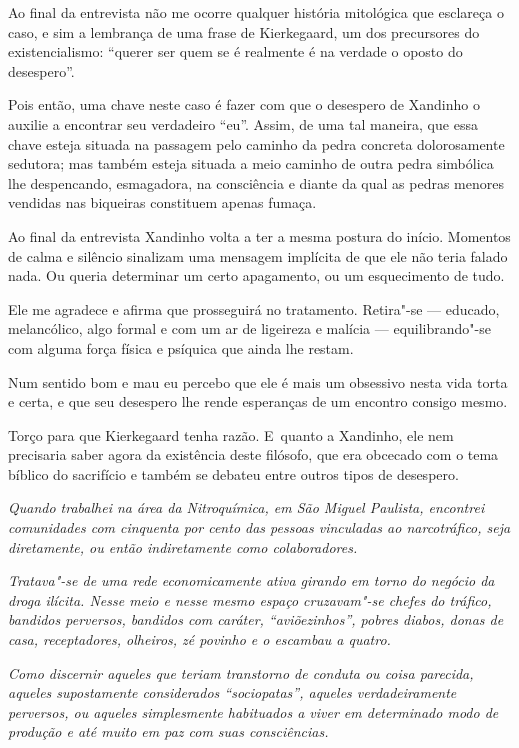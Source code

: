 \asterisc{}

Ao final da entrevista não me ocorre qualquer história mitológica que
esclareça o caso, e sim a lembrança de uma frase de Kierkegaard, um dos
precursores do existencialismo: ``querer ser quem se é realmente é na
verdade o oposto do desespero''.

Pois então, uma chave neste caso é fazer com que o desespero de Xandinho
o auxilie a encontrar seu verdadeiro ``eu''. Assim, de uma tal maneira,
que essa chave esteja situada na passagem pelo caminho da pedra concreta
dolorosamente sedutora; mas também esteja situada a meio caminho de
outra pedra simbólica lhe despencando, esmagadora, na consciência e
diante da qual as pedras menores vendidas nas biqueiras constituem
apenas fumaça.

Ao final da entrevista Xandinho volta a ter a mesma postura do início.
Momentos de calma e silêncio sinalizam uma mensagem implícita de que ele
não teria falado nada. Ou queria determinar um certo apagamento, ou um
esquecimento de tudo.

Ele me agradece e afirma que prosseguirá no tratamento. Retira"-se ---
educado, melancólico, algo formal e com um ar de ligeireza e malícia ---
equilibrando"-se com alguma força física e psíquica que ainda lhe restam.

Num sentido bom e mau eu percebo que ele é mais um obsessivo nesta vida
torta e certa, e que seu desespero lhe rende esperanças de um encontro
consigo mesmo.

Torço para que Kierkegaard tenha razão. E~quanto a Xandinho, ele nem
precisaria saber agora da existência deste filósofo, que era obcecado
com o tema bíblico do sacrifício e também se debateu entre outros tipos
de desespero.~

\asterisc{}
\begingroup\small

\emph{Quando trabalhei na área da Nitroquímica, em
São Miguel Paulista, encontrei comunidades com cinquenta por cento das
pessoas vinculadas ao narcotráfico, seja diretamente, ou então
indiretamente como colaboradores.}

\emph{Tratava"-se de uma rede economicamente ativa girando em torno do
negócio da droga ilícita. Nesse meio e nesse mesmo espaço cruzavam"-se
chefes do tráfico, bandidos perversos, bandidos com caráter,
``aviõezinhos'', pobres diabos, donas de casa, receptadores, olheiros,
zé povinho e o escambau a quatro.}

\emph{Como discernir aqueles que teriam transtorno
de conduta ou coisa parecida, aqueles supostamente considerados
``sociopatas'', aqueles verdadeiramente perversos, ou aqueles
simplesmente habituados a viver em determinado modo de produção e até
muito em paz com suas consciências.}


